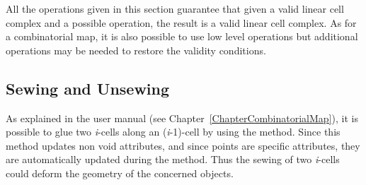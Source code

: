 
All the operations given in this section guarantee that given a valid
linear cell complex and a possible operation, the result is a valid
linear cell complex. As for a combinatorial map, it is also possible
to use low level operations but additional operations may be needed to
restore the validity conditions.


\subsection{Sewing and Unsewing \label{ssec-lcc-link-darts}}

As explained in the  user manual (see
Chapter~\ref{ChapterCombinatorialMap}), it is possible to glue two
\emph{i}-cells along an (\emph{i}-1)-cell by using the 
method. Since this method updates non void attributes, and since
points are specific attributes, they are automatically updated during
the  method. Thus the sewing of two \emph{i}-cells could
deform the geometry of the concerned objects.

